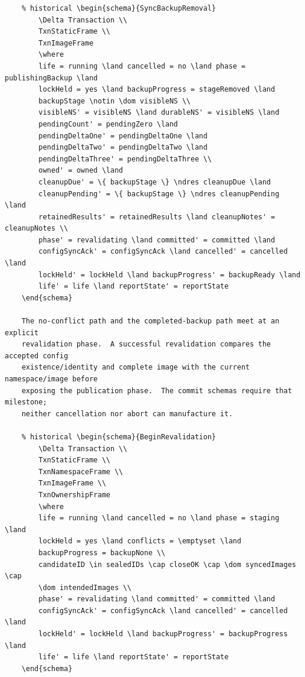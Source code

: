 \documentclass{article}
\begin{document}
\begin{verbatim}
	% historical \begin{schema}{SyncBackupRemoval}
		\Delta Transaction \\
		TxnStaticFrame \\
		TxnImageFrame
		\where
		life = running \land cancelled = no \land phase = publishingBackup \land
		lockHeld = yes \land backupProgress = stageRemoved \land
		backupStage \notin \dom visibleNS \\
		visibleNS' = visibleNS \land durableNS' = visibleNS \land
		pendingCount' = pendingZero \land
		pendingDeltaOne' = pendingDeltaOne \land
		pendingDeltaTwo' = pendingDeltaTwo \land
		pendingDeltaThree' = pendingDeltaThree \\
		owned' = owned \land
		cleanupDue' = \{ backupStage \} \ndres cleanupDue \land
		cleanupPending' = \{ backupStage \} \ndres cleanupPending \land
		retainedResults' = retainedResults \land cleanupNotes' = cleanupNotes \\
		phase' = revalidating \land committed' = committed \land
		configSyncAck' = configSyncAck \land cancelled' = cancelled \land
		lockHeld' = lockHeld \land backupProgress' = backupReady \land
		life' = life \land reportState' = reportState
	\end{schema}

	The no-conflict path and the completed-backup path meet at an explicit
	revalidation phase.  A successful revalidation compares the accepted config
	existence/identity and complete image with the current namespace/image before
	exposing the publication phase.  The commit schemas require that milestone;
	neither cancellation nor abort can manufacture it.

	% historical \begin{schema}{BeginRevalidation}
		\Delta Transaction \\
		TxnStaticFrame \\
		TxnNamespaceFrame \\
		TxnImageFrame \\
		TxnOwnershipFrame
		\where
		life = running \land cancelled = no \land phase = staging \land
		lockHeld = yes \land conflicts = \emptyset \land
		backupProgress = backupNone \\
		candidateID \in sealedIDs \cap closeOK \cap \dom syncedImages \cap
		\dom intendedImages \\
		phase' = revalidating \land committed' = committed \land
		configSyncAck' = configSyncAck \land cancelled' = cancelled \land
		lockHeld' = lockHeld \land backupProgress' = backupProgress \land
		life' = life \land reportState' = reportState
	\end{schema}


\end{verbatim}
\end{document}
